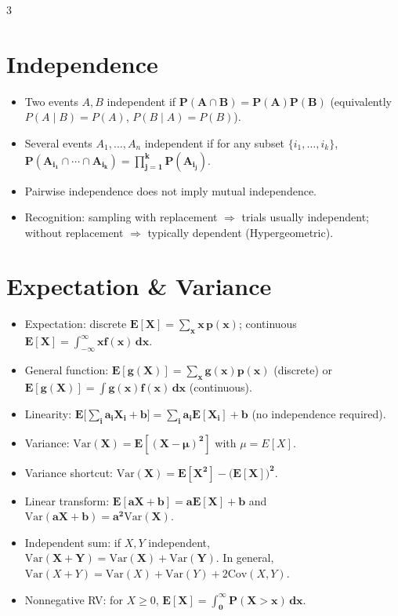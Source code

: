 \documentclass[11pt,landscape]{article}
\begin{document}
\begin{multicols}{3}
\section{Independence}
\begin{itemize}
  \item Two events $A,B$ independent if $\mathbf{P(A\cap B)=P(A)P(B)}$ (equivalently $P(A\mid B)=P(A)$, $P(B\mid A)=P(B)$).
  \item Several events $A_1,\dots,A_n$ independent if for any subset $\{i_1,\dots,i_k\}$, $\mathbf{P(A_{i_1}\cap\cdots\cap A_{i_k})=\prod_{j=1}^k P(A_{i_j})}$.
  \item Pairwise independence does not imply mutual independence.
  \item Recognition: sampling with replacement $\Rightarrow$ trials usually independent; without replacement $\Rightarrow$ typically dependent (Hypergeometric).
\end{itemize}

\section{Expectation \& Variance}
\begin{itemize}
  \item Expectation: discrete $\mathbf{E[X]=\sum_x x\,p(x)}$; continuous $\mathbf{E[X]=\int_{-\infty}^{\infty} x f(x)\,dx}$.
  \item General function: $\mathbf{E[g(X)]=\sum_x g(x)p(x)}$ (discrete) or $\mathbf{E[g(X)]=\int g(x)f(x)\,dx}$ (continuous).
  \item Linearity: $\mathbf{E\big[\sum_i a_i X_i + b\big]=\sum_i a_i E[X_i]+b}$ (no independence required).
  \item Variance: $\mathbf{\mathrm{Var}(X)=E[(X-\mu)^2]}$ with $\mu=E[X]$.
  \item Variance shortcut: $\mathbf{\mathrm{Var}(X)=E[X^2]-\big(E[X]\big)^2}$.
  \item Linear transform: $\mathbf{E[aX+b]=aE[X]+b}$ and $\mathbf{\mathrm{Var}(aX+b)=a^2\mathrm{Var}(X)}$.
  \item Independent sum: if $X,Y$ independent, $\mathbf{\mathrm{Var}(X+Y)=\mathrm{Var}(X)+\mathrm{Var}(Y)}$. In general, $\mathrm{Var}(X+Y)=\mathrm{Var}(X)+\mathrm{Var}(Y)+2\mathrm{Cov}(X,Y)$.
  \item Nonnegative RV: for $X\ge0$, $\mathbf{E[X]=\int_{0}^{\infty} P(X>x)\,dx}$.
\end{itemize}


\end{multicols}
\end{document}

